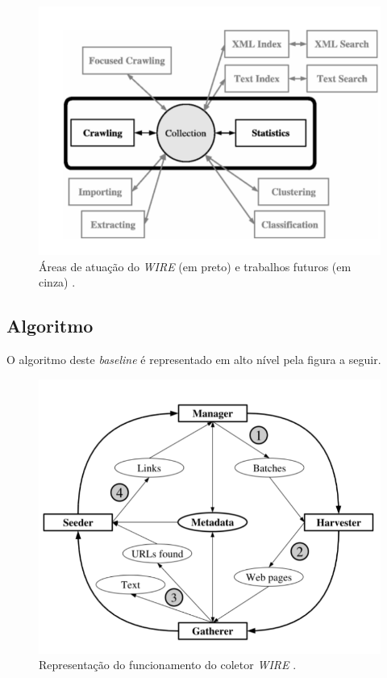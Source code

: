 \documentclass[a4paper,12pt,titlepage]{article}
\begin{document}
\begin{figure}[H]
     \centering
     \includegraphics[scale=0.6]{figures/wire-architecture.png}
     \caption{Áreas de atuação do \textit{WIRE} (em preto) e trabalhos futuros (em cinza) \cite{carlos}.}
     \label{bsp}
\end{figure}

\subsection{Algoritmo}

O algoritmo deste \textit{baseline} é representado em alto nível pela figura a seguir.

\begin{figure}[H]
     \centering
     \includegraphics[scale=0.45]{figures/wire-crawling-architecture-2.png}
     \caption{Representação do funcionamento do coletor \textit{WIRE} \cite{carlos}.}
     \label{bsp}
\end{figure}
\end{document}
